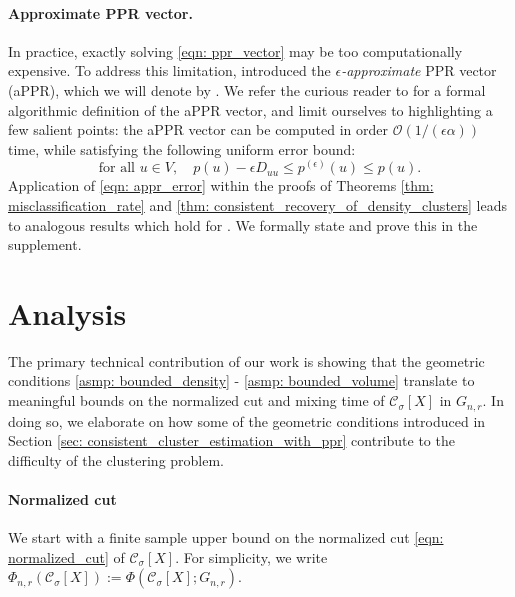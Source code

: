 \documentclass{article}
\newcommand{\1}{\mathbf{1}}
\newcommand{\pbf}{p}        %
\newcommand{\Xbf}{X}             %
\newcommand{\Dbf}{D}
\newcommand{\Cset}{\mathcal{C}}
\newcommand{\Csig}{\Cset_{\sigma}}
\theoremstyle{aldenthm}
\theoremstyle{aldenrmrk}
\begin{document}
\paragraph{Approximate PPR vector.}  In practice, exactly solving \eqref{eqn:
  ppr_vector} may be too computationally expensive. To address this limitation,
\citet{andersen2006} introduced the \emph{$\epsilon$-approximate} PPR vector
(aPPR), which we will denote by \smash{$\pbf^{(\epsilon)}$}. We refer the
curious reader to \citet{andersen2006} for a formal algorithmic definition of
the aPPR vector, and limit ourselves to highlighting a few salient points: the
aPPR vector can be computed in order $\mathcal{O}(1/(\epsilon\alpha))$ time,
while satisfying the following uniform error bound: 
\begin{equation}
\label{eqn: appr_error}
\textrm{for all $u \in V$}, \quad \pbf(u) - \epsilon \Dbf_{uu}\leq
\pbf^{(\epsilon)}(u) \leq \pbf(u).  
\end{equation}
Application of \eqref{eqn: appr_error} within the proofs of Theorems \ref{thm:
  misclassification_rate} and \ref{thm: consistent_recovery_of_density_clusters}
leads to analogous results which hold for \smash{$\pbf^{(\epsilon)}$}. We
formally state and prove this in the supplement. 

\section{Analysis}
\label{sec: analysis}

The primary technical contribution of our work is showing that the geometric conditions \ref{asmp: bounded_density} - \ref{asmp: bounded_volume} translate to meaningful bounds on the normalized cut and mixing time of $\Csig[\Xbf]$ in $G_{n,r}$. In doing so, we elaborate on how some of the geometric conditions introduced in Section \ref{sec: consistent_cluster_estimation_with_ppr} contribute to the difficulty of the clustering problem.

\paragraph{Normalized cut} We start with a finite sample upper bound on the normalized cut \eqref{eqn: normalized_cut} of 
$\Cset_\sigma[\Xbf]$. For simplicity, we write $\Phi_{n,r}(\Csig[\Xbf]) := \Phi(\Csig[\Xbf]; G_{n,r})$.
\end{document}
